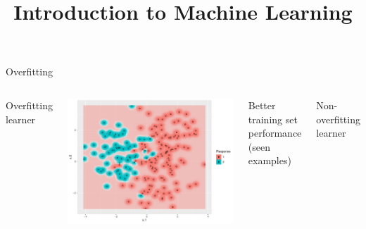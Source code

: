 \documentclass[11pt,compress,t,notes=noshow, xcolor=table]{beamer}
\title{Introduction to Machine Learning}
\institute{\href{https://compstat-lmu.github.io/lecture_i2ml/}{compstat-lmu.github.io/lecture\_i2ml}}
\date{}
\newenvironment{knitrout}{}{} %
\begin{document}














\begin{vbframe}{Overfitting}

\begin{columns}[T,onlytextwidth]
Overfitting learner \\
\vspace{0.5cm}
\begin{knitrout}\scriptsize
{}\color{fgcolor}

{\centering \includegraphics[width=\textwidth]{figure/eval_ofit_1} 

}



\end{knitrout}
Better training set performance (seen examples)

Non-overfitting learner \\
\vspace{0.5cm}
\begin{knitrout}\scriptsize
{}\color{fgcolor}


\end{knitrout}
\end{columns}
\end{vbframe}
\end{document}
